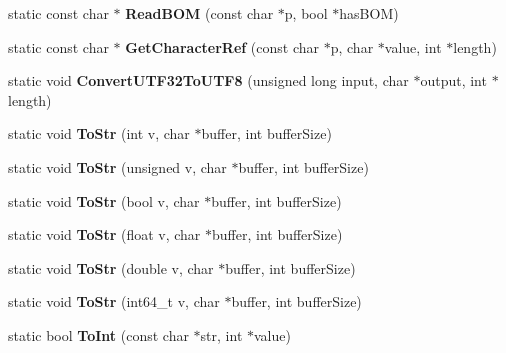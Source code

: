 \begin{DoxyCompactItemize}
static const char $\ast$ {\bfseries Read\+B\+OM} (const char $\ast$p, bool $\ast$has\+B\+OM)
\item 
\mbox{\label{classtinyxml2_1_1XMLUtil_acddca74146deab644195d600bdd96a9b}} 
static const char $\ast$ {\bfseries Get\+Character\+Ref} (const char $\ast$p, char $\ast$value, int $\ast$length)
\item 
\mbox{\label{classtinyxml2_1_1XMLUtil_aad2d5b0f7e4327bff0bf558148f01a82}} 
static void {\bfseries Convert\+U\+T\+F32\+To\+U\+T\+F8} (unsigned long input, char $\ast$output, int $\ast$length)
\item 
\mbox{\label{classtinyxml2_1_1XMLUtil_a5819187d33b5b4d626399118eb622016}} 
static void {\bfseries To\+Str} (int v, char $\ast$buffer, int buffer\+Size)
\item 
\mbox{\label{classtinyxml2_1_1XMLUtil_a096ca738f14b06866d99489e1c315402}} 
static void {\bfseries To\+Str} (unsigned v, char $\ast$buffer, int buffer\+Size)
\item 
\mbox{\label{classtinyxml2_1_1XMLUtil_ad77298cc6025249b28da58c7289190d1}} 
static void {\bfseries To\+Str} (bool v, char $\ast$buffer, int buffer\+Size)
\item 
\mbox{\label{classtinyxml2_1_1XMLUtil_a6aef5d230e3972fbedda75b0ba5bbcdb}} 
static void {\bfseries To\+Str} (float v, char $\ast$buffer, int buffer\+Size)
\item 
\mbox{\label{classtinyxml2_1_1XMLUtil_a5ddef1a1d33db500b74b45110df48b6c}} 
static void {\bfseries To\+Str} (double v, char $\ast$buffer, int buffer\+Size)
\item 
\mbox{\label{classtinyxml2_1_1XMLUtil_abce55b1eb11af278acdd59fd1db12e34}} 
static void {\bfseries To\+Str} (int64\+\_\+t v, char $\ast$buffer, int buffer\+Size)
\item 
\mbox{\label{classtinyxml2_1_1XMLUtil_ac7fa220dd1c428ed6a77850d56a6e4bf}} 
static bool {\bfseries To\+Int} (const char $\ast$str, int $\ast$value)

\end{DoxyCompactItemize}
